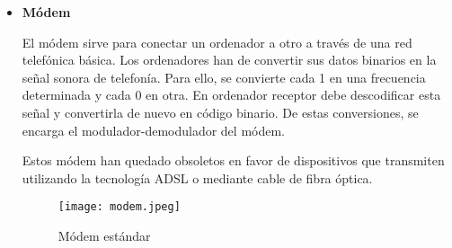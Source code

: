 \begin{itemize}
\begin{itemize}
    \item \textbf{Módem}

    El módem sirve para conectar un ordenador a otro a través de una red telefónica básica. Los ordenadores han de convertir sus datos binarios en la señal sonora de telefonía. Para ello, se convierte cada 1 en una frecuencia determinada y cada 0 en otra. En ordenador receptor debe descodificar esta señal y convertirla de nuevo en código binario. De estas conversiones, se encarga el modulador-demodulador del módem.

    Estos módem han quedado obsoletos en favor de dispositivos que transmiten utilizando la tecnología ADSL o mediante cable de fibra óptica.

    \begin{figure}[ht]
        \centering
        \texttt{[image: modem.jpeg]}
        \caption{Módem estándar}
    \end{figure}
    \end{itemize}
\end{itemize}













\glsaddall
\printglossaries


\newpage
{}



